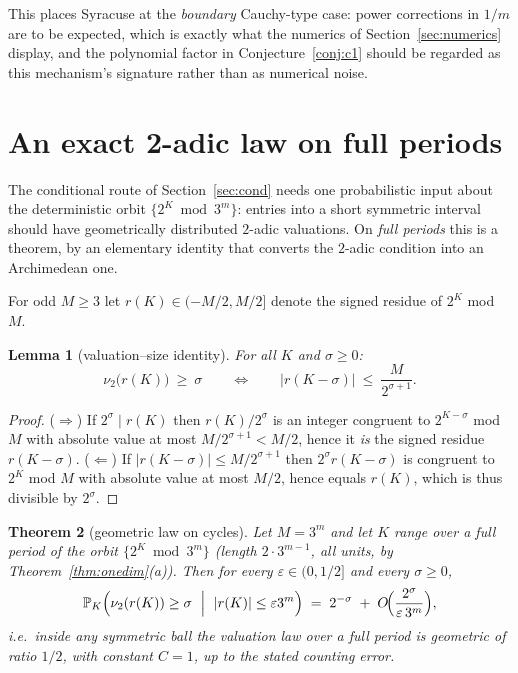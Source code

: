 \documentclass[11pt]{article}
\newtheorem{theorem}{Theorem}[section]
\newtheorem{lemma}[theorem]{Lemma}
\theoremstyle{definition}
\newcommand{\Prob}{\mathbb{P}}
\begin{document}
This places Syracuse at the \emph{boundary} Cauchy-type case: power
corrections in $1/m$ are to be expected, which is
exactly what the numerics of Section~\ref{sec:numerics} display, and the
polynomial factor in Conjecture~\ref{conj:c1} should be regarded as this
mechanism's signature rather than as numerical noise.

\section{An exact 2-adic law on full periods}\label{sec:cstat}

The conditional route of Section~\ref{sec:cond} needs one probabilistic
input about the deterministic orbit $\{2^K \bmod 3^m\}$: entries into a
short symmetric interval should have geometrically distributed $2$-adic
valuations. On \emph{full periods} this is a theorem, by an elementary
identity that converts the $2$-adic condition into an Archimedean one.

For odd $M\ge 3$ let $r(K)\in(-M/2,M/2]$ denote the signed residue of
$2^K$ mod $M$.

\begin{lemma}[valuation--size identity]\label{lem:val}
For all $K$ and $\sigma\ge 0$:
\[
\nu_2\bigl(r(K)\bigr)\ \ge\ \sigma
\qquad\Longleftrightarrow\qquad
\bigl|r(K-\sigma)\bigr|\ \le\ \frac{M}{2^{\sigma+1}} .
\]
\end{lemma}

\begin{proof}
($\Rightarrow$) If $2^{\sigma}\mid r(K)$ then $r(K)/2^{\sigma}$ is an
integer congruent to $2^{K-\sigma}$ mod $M$ with absolute value at most
$M/2^{\sigma+1}<M/2$, hence it \emph{is} the signed residue $r(K-\sigma)$.
($\Leftarrow$) If $|r(K-\sigma)|\le M/2^{\sigma+1}$ then
$2^{\sigma}r(K-\sigma)$ is congruent to $2^{K}$ mod $M$ with absolute
value at most $M/2$, hence equals $r(K)$, which is thus divisible by
$2^{\sigma}$.
\end{proof}

\begin{theorem}[geometric law on cycles]\label{thm:cstat}
Let $M=3^m$ and let $K$ range over a full period of the orbit
$\{2^K \bmod 3^m\}$ (length $2\cdot 3^{m-1}$, all units, by
Theorem~\ref{thm:onedim}(a)). Then for every $\varepsilon\in(0,1/2]$ and
every $\sigma\ge 0$,
\[
\Prob_K\Bigl(\nu_2(r(K))\ge\sigma\ \Bigm|\ |r(K)|\le\varepsilon 3^m\Bigr)
\;=\;2^{-\sigma}\;+\;O\!\Bigl(\frac{2^{\sigma}}{\varepsilon\,3^{m}}\Bigr),
\]
i.e.\ inside any symmetric ball the valuation law over a full period is
geometric of ratio $1/2$, with constant $C=1$, up to the stated counting
error.
\end{theorem}
\end{document}
